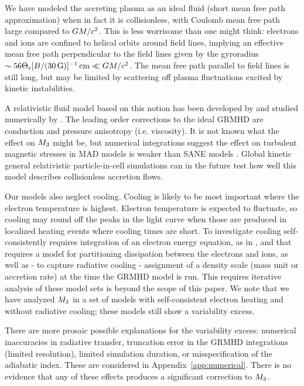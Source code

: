 We have modeled the accreting plasma as an ideal fluid (short mean free path approximation) when in fact it is collisionless, with Coulomb mean free path large compared to $GM/c^2$.  This is less worrisome than one might think: electrons and ions are confined to helical orbits around field lines, implying an effective mean free path perpendicular to the field lines given by the gyroradius $\sim 56 \Theta_e [B/(30\,\mathrm{G})]^{-1} \,\mathrm{cm} \ll GM/c^2$.  The mean free path parallel to field lines is still long, but may be limited by scattering off plasma fluctuations excited by kinetic instabilities.

A relativistic fluid model based on this notion has been developed by \citet{2015ApJ...810..162C} and studied numerically by \citet{2017MNRAS.470.2240F}.  The leading order corrections to the ideal GRMHD are conduction and pressure anisotropy (i.e. viscosity).  It is not known what the effect on $M_{3}$ might be, but numerical integrations suggest the effect on turbulent magnetic stresses in MAD models is weaker than SANE models \citep{2017MNRAS.470.2240F}.  Global kinetic general relativistic particle-in-cell simulations can in the future test how well this model describes collisionless accretion flows.

Our models also neglect cooling.  Cooling is likely to be most important where the electron temperature is highest.  Electron temperature is expected to fluctuate, so cooling may round off the peaks in the light curve when those are produced in localized heating events where cooling times are short.  To investigate cooling self-consistently requires integration of an electron energy equation, as in \cite{2015MNRAS.454.1848R}, and that requires a model for partitioning dissipation between the electrons and ions, as well as - to capture radiative cooling - assignment of a density scale (mass unit or accretion rate) at the time the GRMHD model is run.  This requires iterative analysis of these model sets is beyond the scope of this paper.  We note that we have analyzed $M_{3}$ in a set of models with self-consistent electron heating and without radiative cooling; these models still show a variability excess.

There are more prosaic possible explanations for the variability excess: numerical inaccuracies in radiative transfer, truncation error in the GRMHD integrations (limited resolution), limited simulation duration, or misspecification of the adiabatic index.  These are considered in Appendix~\ref{app:numerical}.  There is no evidence that any of these effects produces a significant correction to $M_{3}$.

